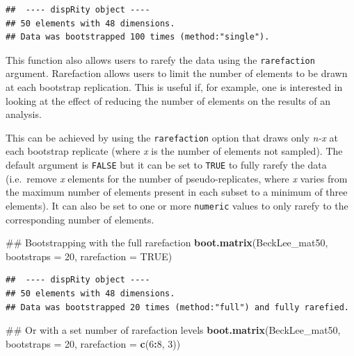 \documentclass[]{book}
\newenvironment{Shaded}{\begin{snugshade}}{\end{snugshade}}
\newcommand{\KeywordTok}[1]{\textcolor[rgb]{0.13,0.29,0.53}{\textbf{#1}}}
\newcommand{\DataTypeTok}[1]{\textcolor[rgb]{0.13,0.29,0.53}{#1}}
\newcommand{\DecValTok}[1]{\textcolor[rgb]{0.00,0.00,0.81}{#1}}
\newcommand{\OtherTok}[1]{\textcolor[rgb]{0.56,0.35,0.01}{#1}}
\newcommand{\OperatorTok}[1]{\textcolor[rgb]{0.81,0.36,0.00}{\textbf{#1}}}
\newcommand{\NormalTok}[1]{#1}
\theoremstyle{definition}
\theoremstyle{definition}
\theoremstyle{remark}
\begin{document}
\begin{verbatim}
##  ---- dispRity object ---- 
## 50 elements with 48 dimensions.
## Data was bootstrapped 100 times (method:"single").
\end{verbatim}

This function also allows users to rarefy the data using the
\texttt{rarefaction} argument. Rarefaction allows users to limit the
number of elements to be drawn at each bootstrap replication. This is
useful if, for example, one is interested in looking at the effect of
reducing the number of elements on the results of an analysis.

This can be achieved by using the \texttt{rarefaction} option that draws
only \emph{n-x} at each bootstrap replicate (where \emph{x} is the
number of elements not sampled). The default argument is \texttt{FALSE}
but it can be set to \texttt{TRUE} to fully rarefy the data (i.e.~remove
\emph{x} elements for the number of pseudo-replicates, where \emph{x}
varies from the maximum number of elements present in each subset to a
minimum of three elements). It can also be set to one or more
\texttt{numeric} values to only rarefy to the corresponding number of
elements.

\begin{Shaded}
\begin{Highlighting}[]
\NormalTok{## Bootstrapping with the full rarefaction}
\KeywordTok{boot.matrix}\NormalTok{(BeckLee_mat50, }\DataTypeTok{bootstraps =} \DecValTok{20}\NormalTok{, }\DataTypeTok{rarefaction =} \OtherTok{TRUE}\NormalTok{)}
\end{Highlighting}
\end{Shaded}

\begin{verbatim}
##  ---- dispRity object ---- 
## 50 elements with 48 dimensions.
## Data was bootstrapped 20 times (method:"full") and fully rarefied.
\end{verbatim}

\begin{Shaded}
\begin{Highlighting}[]
\NormalTok{## Or with a set number of rarefaction levels}
\KeywordTok{boot.matrix}\NormalTok{(BeckLee_mat50, }\DataTypeTok{bootstraps =} \DecValTok{20}\NormalTok{, }\DataTypeTok{rarefaction =} \KeywordTok{c}\NormalTok{(}\DecValTok{6}\OperatorTok{:}\DecValTok{8}\NormalTok{, }\DecValTok{3}\NormalTok{))}
\end{Highlighting}
\end{Shaded}
\end{document}
